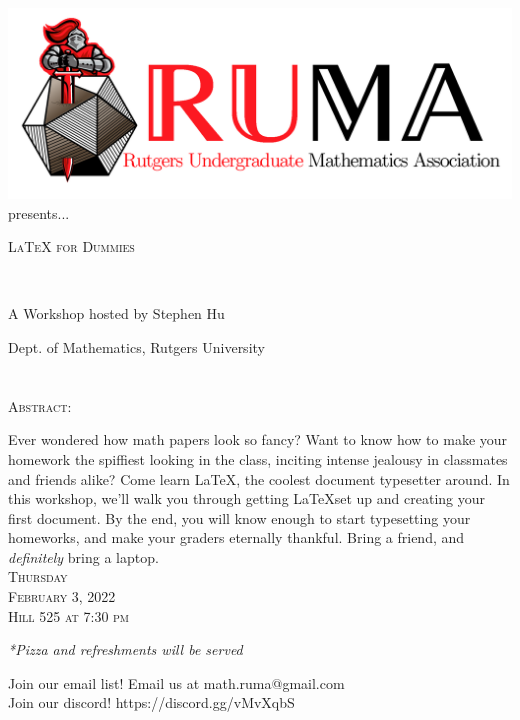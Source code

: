 \documentclass[12pt]{article}
\begin{document}

\begin{center}\includegraphics[scale=.50]{RUMAlogo.png}\\
presents... \\
\begin{spacing}{1}
{\fontsize{36}{36}\selectfont  \textsc{
LaTeX for Dummies}} \end{spacing}
 

~~\\
\begin{spacing}{1.5}
{\fontsize{24}{24} \selectfont A Workshop hosted by Stephen Hu}  \end{spacing} 
\large Dept. of Mathematics, Rutgers University \\~~\\
~~\\

\normalsize
\textsc{Abstract:}

\LARGE
Ever wondered how math papers look so fancy? Want to know how to make your homework the spiffiest looking in the class, inciting intense jealousy in classmates and friends alike? Come learn \LaTeX, the coolest document typesetter around. In this workshop, we'll walk you through getting \LaTeX\:set up and creating your first document. By the end, you will know enough to start typesetting your homeworks, and make your graders eternally thankful. Bring a friend, and \textit{definitely} bring a laptop. 
\\

\vspace{5mm} 
\Huge   \textsc{Thursday\\February 3, 2022 \\Hill 525 at 7:30
  pm}

\vspace{2mm}
\large
\emph{*Pizza and refreshments will be served}
\end{center}

\begin{center}
  \Large  Join our email list! Email us at
  math.ruma@gmail.com\\Join our discord!
  https://discord.gg/vMvXqbS
\end{center}
\end{document}
